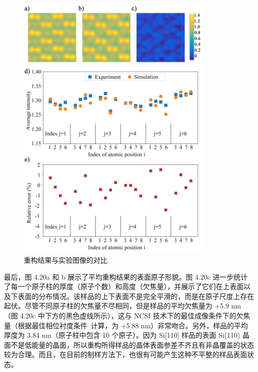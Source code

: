 \begin{figure}[H]
	\vspace{\baselineskip}
	\centering
	\includegraphics[width=0.85\textwidth]{../2.18/218}
	\caption{重构结果与实验图像的对比}\label{fig:218}
	\song{}
\end{figure}


最后，图 4.20a 和 b 展示了平均重构结果的表面原子形貌。图 4.20c 进一步统计了每一个原子柱的厚度（原子个数）和高度（欠焦量），并展示了它们在上表面以及下表面的分布情况。该样品的上下表面不是完全平滑的，而是在原子尺度上存在起伏。尽管不同原子柱的欠焦量不尽相同，但是样品的平均欠焦量为 +5.9 nm（图 4.20c 中下方的黑色虚线所示），这与 NCSI 技术下的最佳成像条件下的欠焦量（根据最佳相位衬度条件~\cite{Urban2009}计算，为 +5.88 nm）非常吻合。另外，样品的平均厚度为 3.84 nm（原子柱中包含 10 个原子）。因为 Si[110] 样品的表面 Si(110) 晶面不是低能量的晶面，所以重构所得样品的晶体表面参差不齐且有非晶覆盖的状态较为合理。而且，在目前的制样方法下，也很有可能产生这种不平整的样品表面状态。


